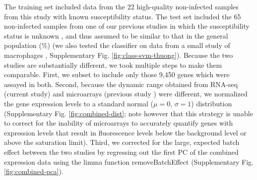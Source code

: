 \documentclass[fleqn,10pt]{wlscirep}
\begin{document}
The training set included data from the 22 high-quality non-infected
samples from this study with known susceptibility status. The test set
included the 65 non-infected samples from one of our previous studies
in which the susceptibility status is unknown \cite{Barreiro2012}, and
thus assumed to be similar to that in the general population
(\%) (we also tested the classifier on data from a
small study of macrophages \cite{Thuong2008}, Supplementary Fig.
\ref{fig:class-svm-thuong}). Because the two studies are substantially
different, we took multiple steps to make them comparable. First, we
subset to include only those 9,450 genes which were assayed in both.
Second, because the dynamic range obtained from RNA-seq (current
study) and microarrays (previous study \cite{Barreiro2012}) were
different, we normalized the gene expression levels to a standard
normal ($\mu = 0$, $\sigma = 1$) distribution (Supplementary Fig.
\ref{fig:combined-dist}; note however that this strategy is unable to
correct for the inability of microarrays to accurately quantify genes
with expression levels that result in fluorescence levels below the
background level or above the saturation limit). Third, we corrected
for the large, expected batch effect between the two studies by
regressing out the first PC of the combined expression data using the
limma function removeBatchEffect \cite{Ritchie2015} (Supplementary
Fig. \ref{fig:combined-pca}).
\end{document}
